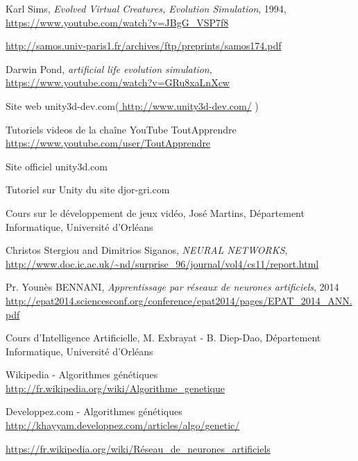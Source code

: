 \begin{thebibliography}{99}



 

Karl Sims,
 \emph{Evolved Virtual Creatures, Evolution Simulation}, 1994,
 \url{https://www.youtube.com/watch?v=JBgG\_VSP7f8}

 \url{http://samos.univ-paris1.fr/archives/ftp/preprints/samos174.pdf}

Darwin Pond,
\emph{artificial life evolution simulation},
\url{https://www.youtube.com/watch?v=GRu8xaLnXcw}


 Site web unity3d-dev.com(\url{ http://www.unity3d-dev.com/}  )

Tutoriels videos de la chaîne YouTube ToutApprendre \url{https://www.youtube.com/user/ToutApprendre}

Site officiel unity3d.com

Tutoriel sur Unity du site djor-gri.com

Cours sur le développement de jeux vidéo, José Martins, Département Informatique, Université d'Orléans

Christos Stergiou and Dimitrios Siganos,
\emph{NEURAL NETWORKS}, 
\url{http://www.doc.ic.ac.uk/~nd/surprise_96/journal/vol4/cs11/report.html}

Pr. Younès BENNANI,
\emph{Apprentissage par réseaux de neurones artificiels}, 2014
\url{http://epat2014.sciencesconf.org/conference/epat2014/pages/EPAT_2014_ANN.pdf}

Cours d'Intelligence Artificielle, M. Exbrayat - B. Diep-Dao, Département Informatique, Université d'Orléans

Wikipedia - Algorithmes génétiques \url{http://fr.wikipedia.org/wiki/Algorithme_genetique}

Developpez.com - Algorithmes génétiques \url{http://khayyam.developpez.com/articles/algo/genetic/}

\url{https://fr.wikipedia.org/wiki/Réseau_de_neurones_artificiels}

\end{thebibliography}
